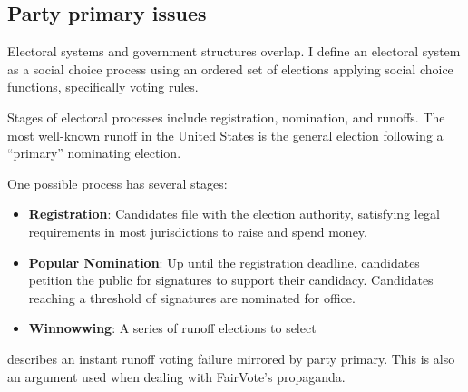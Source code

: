 \subsection{Party primary issues}

\begin{boxcomment}
    Electoral systems and government structures overlap.  I define an electoral system as a social choice process using an ordered set of elections applying social choice functions, specifically voting rules.

    Stages of electoral processes include registration, nomination, and runoffs.  The most well-known runoff in the United States is the general election following a ``primary'' nominating election.

    One possible process has several stages:
    \begin{itemize}
        \item \textbf{Registration}:  Candidates file with the election authority, satisfying legal requirements in most jurisdictions to raise and spend money.

        \item \textbf{Popular Nomination}:  Up until the registration deadline, candidates petition the public for signatures to support their candidacy.  Candidates reaching a threshold of signatures are nominated for office.

        \item \textbf{Winnowwing}:  A series of runoff elections to select
    \end{itemize}
\end{boxcomment}

 describes an instant runoff voting failure mirrored by party primary.  This is also an argument used when dealing with FairVote's propaganda.

